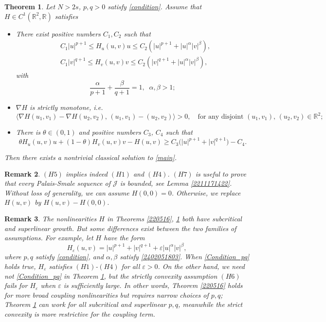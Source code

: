 \documentclass[10pt]{article}
\numberwithin{equation}{section}
\newtheorem{theorem}{Theorem}[section]
\newtheorem{remark}[theorem]{Remark}
\numberwithin{equation}{section}
\begin{document}
\begin{theorem}\label{2211092215}
Let $N>2s$, $p, q>0$ satisfy \eqref{condition}. Assume that $H \in C^1(\mathbb{R}^2, \mathbb{R})$ satisfies
\begin{itemize}
\item[$(H5)$] There exist positive numbers $C_1, C_2$ such that
\[
\begin{split}
&C_1|u|^{p+1}\le H_u(u,v)u\le C_2\left( |u|^{p+1}+  |u|^{\alpha}|v|^{\beta}\right),\\
&C_1|v|^{q+1}\le H_v(u,v)v\le C_2\left( |v|^{q+1}+  |u|^{\alpha}|v|^{\beta}\right),
\end{split}
\]
 with
\begin{equation}\label{2402051803}
\frac{\alpha}{p+1}+\frac{\beta}{q+1}=1,\;\; \alpha, \beta>1;
\end{equation}
\item[$(H6)$] $\nabla H$ is strictly monotone, i.e.
\[
\langle \nabla H(u_1, v_1)-\nabla H(u_2, v_2),\, (u_1,v_1)- (u_2,v_2)\rangle>0,\quad \mbox{for any disjoint } (u_1, v_1),\, (u_2, v_2)\in \mathbb{R}^2;
\]
\item[$(H7)$] There is $\theta \in (0, 1)$ and positive numbers $C_3$, $C_4$ such that
\[
\theta H_u(u,v)u+ (1- \theta)H_v(u,v)v- H(u,v)\ge C_3\Big(|u|^{p+1}+|v|^{q+1}\Big)-C_4.
\]
\end{itemize}
Then there exists a nontrivial classical solution to \eqref{main}.
\end{theorem}
\begin{remark}
$(H5)$ implies indeed $(H1)$ and $(H4)$.  $(H7)$ is useful to prove that every Palais-Smale sequence of $\mathcal{J}$ is bounded, see Lemma \ref{2211171422}. Without loss of generality, we can assume $H(0, 0)=0$. Otherwise, we replace $H(u, v)$ by $H(u, v)-H(0, 0)$.
\end{remark}

\begin{remark}
The nonlinearities $H$ in Theorems \ref{220516}, \ref{2211092215} both have subcritical and superlinear growth.
But some differences exist between the two families of assumptions. For example, let $H$ have the form
\begin{equation}\label{2402052125}
H_\varepsilon(u, v)=|u|^{p+1}+|v|^{q+1}+\varepsilon |u|^{\alpha}|v|^{\beta},
\end{equation}
where $p, q$ satisfy \eqref{condition}, and $\alpha, \beta$ satisfy \eqref{2402051803}. When \eqref{Condition_pq} holds true, $H_\varepsilon$ satisfies $(H1)$-$(H4)$ for all $\varepsilon > 0$. On the other hand, we need not \eqref{Condition_pq} in Theorem \ref{2211092215}, but the strictly convexity assumption $(H6)$ fails for $H_\varepsilon$ when $\varepsilon$ is sufficiently large. In other words, Theorem \ref{220516} holds for more broad coupling nonlinearities but requires narrow choices of $p, q$; Theorem \ref{2211092215} can work for all subcritical and superlinear $p, q$, meanwhile the strict convexity is more restrictive for the coupling term.
\end{remark}
\end{document}
